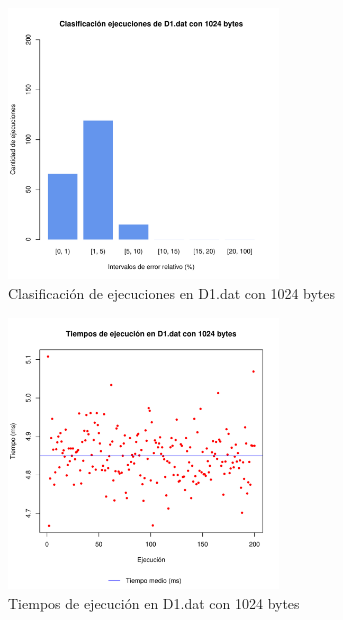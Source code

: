 \begin{figure}[h!]
    \centering
        \includegraphics[width=0.64\textwidth]{../figs/D1/plot_count_1024.pdf}
        \caption{Clasificación de ejecuciones en D1.dat con 1024 bytes}
    \label{figura:D1_count_1024}
\end{figure}

\begin{figure}[h!]
    \centering
        \includegraphics[width=0.64\textwidth]{../figs/D1/plot_time_1024.pdf}
        \caption{Tiempos de ejecución en D1.dat con 1024 bytes}
    \label{figura:D1_time_1024}
\end{figure}

\clearpage

